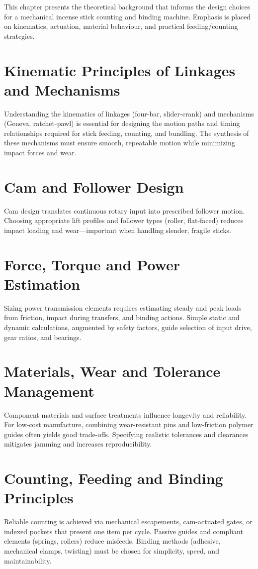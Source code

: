 This chapter presents the theoretical background that informs the design choices for a mechanical incense stick counting and binding machine. Emphasis is placed on kinematics, actuation, material behaviour, and practical feeding/counting strategies.

\section{Kinematic Principles of Linkages and Mechanisms}
Understanding the kinematics of linkages (four-bar, slider-crank) and mechanisms (Geneva, ratchet-pawl) is essential for designing the motion paths and timing relationships required for stick feeding, counting, and bundling. The synthesis of these mechanisms must ensure smooth, repeatable motion while minimizing impact forces and wear.

\section{Cam and Follower Design}
Cam design translates continuous rotary input into prescribed follower motion. Choosing appropriate lift profiles and follower types (roller, flat-faced) reduces impact loading and wear—important when handling slender, fragile sticks.

\section{Force, Torque and Power Estimation}
Sizing power transmission elements requires estimating steady and peak loads from friction, impact during transfers, and binding actions. Simple static and dynamic calculations, augmented by safety factors, guide selection of input drive, gear ratios, and bearings.

\section{Materials, Wear and Tolerance Management}
Component materials and surface treatments influence longevity and reliability. For low-cost manufacture, combining wear-resistant pins and low-friction polymer guides often yields good trade-offs. Specifying realistic tolerances and clearances mitigates jamming and increases reproducibility.

\section{Counting, Feeding and Binding Principles}
Reliable counting is achieved via mechanical escapements, cam-actuated gates, or indexed pockets that present one item per cycle. Passive guides and compliant elements (springs, rollers) reduce misfeeds. Binding methods (adhesive, mechanical clamps, twisting) must be chosen for simplicity, speed, and maintainability.

